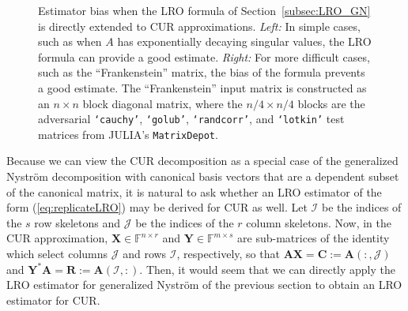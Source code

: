 \documentclass[11pt]{article}
\newenvironment{subfigure}[2][]{\begin{minipage}{#2}\refstepcounter{subfigure}\def\caption##1{\par\smallskip\centering\textbf{(\alph{subfigure})}~##1\par}}{\end{minipage}}
\newcommand{\GN}{generalized Nyström}
\newcommand{\F}{\mathbb{F}}
\begin{document}
\begin{figure}[h]
\begin{subfigure}{0.48\textwidth}
{
}
        \caption{Frankenstein.}
        \label{fig:frankestein-loo}
    \end{subfigure}
    \caption{Estimator bias when the LRO formula of Section~\ref{subsec:LRO_GN} is directly extended to CUR approximations. \textit{Left:} In simple cases, such as when $A$ has exponentially decaying singular values, the LRO formula can provide a good estimate. \textit{Right:} For more difficult cases, such as the ``Frankenstein'' matrix, the bias of the formula prevents a good estimate. The ``Frankenstein'' input matrix is constructed as an $n \times n$ block diagonal matrix, where the $n/4 \times n/4$ blocks are the adversarial \texttt{`cauchy'}, \texttt{`golub'}, \texttt{`randcorr'}, and \texttt{`lotkin'} test matrices from JULIA's \texttt{MatrixDepot}. }
    \label{fig:CUR_LRO_frankenstein}
\end{figure}

Because we can view the CUR decomposition as a special case of the \GN{} decomposition with canonical basis vectors that are a dependent subset of the canonical matrix, it is natural to ask whether an LRO estimator of the form (\ref{eq:replicateLRO}) may be derived for CUR as well.
Let $\mathcal{I}$ be the indices of the $s$ row skeletons and $\mathcal{J}$ be the indices of the $r$ column skeletons.
Now, in the CUR approximation, $\mathbf{X} \in \F^{n \times r}$ and $\mathbf{Y} \in \F^{m \times s}$ are  sub-matrices of the identity which select columns $\mathcal{J}$ and rows $\mathcal{I}$, respectively, so that $\mathbf{A} \mathbf{X} = \mathbf{C}:= \mathbf{A}(:,\mathcal{J})$ and $\mathbf{Y}^*\mathbf{A} = \mathbf{R} := \mathbf{A}(\mathcal{I},:)$.
Then, it would seem that we can directly apply the LRO estimator for \GN{} of the previous section to obtain an LRO estimator for CUR.
\end{document}
